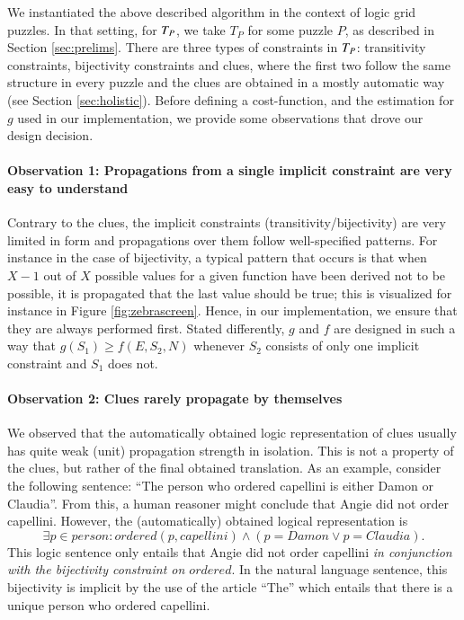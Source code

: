 We instantiated the above described algorithm in the context of logic grid puzzles. 
In that setting, for $T_P$, we take $T_P$ for some puzzle $P$, as described in Section \ref{sec:prelims}. 
There are three types of constraints in $T_P$: transitivity constraints, bijectivity constraints and clues, where the first two follow the same structure in every puzzle and the clues are obtained in a mostly automatic way (see Section \ref{sec:holistic}). 
Before defining a cost-function, and the estimation for $g$ used in our implementation, we provide some observations that drove our design decision. 

\paragraph{Observation 1: Propagations from a single implicit constraint are very easy to understand}\label{obs:1:implicitconstraints} Contrary to the clues, the implicit constraints (transitivity/bijectivity) are very limited in form and propagations over them follow well-specified patterns. 
For instance in the case of bijectivity, a typical pattern that occurs is that when $X-1$ out of $X$ possible values for a given function have been derived not to be possible, it is propagated that the last value should be true; this is visualized for instance in Figure \ref{fig:zebrascreen}. 
Hence, in our implementation, we ensure that they are always performed first. Stated differently, $g$ and $f$ are designed in such a way that $g(S_1)\geq f(E,S_2,N)$  whenever $S_2$ consists of only one implicit constraint and $S_1$ does not. 

\paragraph{Observation 2: Clues rarely propagate by themselves}\label{obs:2:cluespropagate}
We observed that the automatically obtained logic representation of clues usually has quite weak (unit) propagation strength in isolation. 
This is not a property of the clues, but rather of the final obtained translation. As an example, consider the following sentence: 
``The person who ordered capellini is either Damon or Claudia''. From this, a human reasoner might conclude that Angie did not order capellini. 
However, the (automatically) obtained logical representation is 
\[\exists p\in \mathit{person}: \mathit{ordered}(p, \mathit{capellini})\land (p =  \mathit{Damon}\lor p =  \mathit{Claudia}).\]
This logic sentence only entails that Angie did not order capellini \emph{in conjunction with the bijectivity constraint on $ \mathit{ordered}$}.
In the natural language sentence, this bijectivity is implicit by the use of the article ``The'' which entails that there is a unique person who ordered capellini. 

